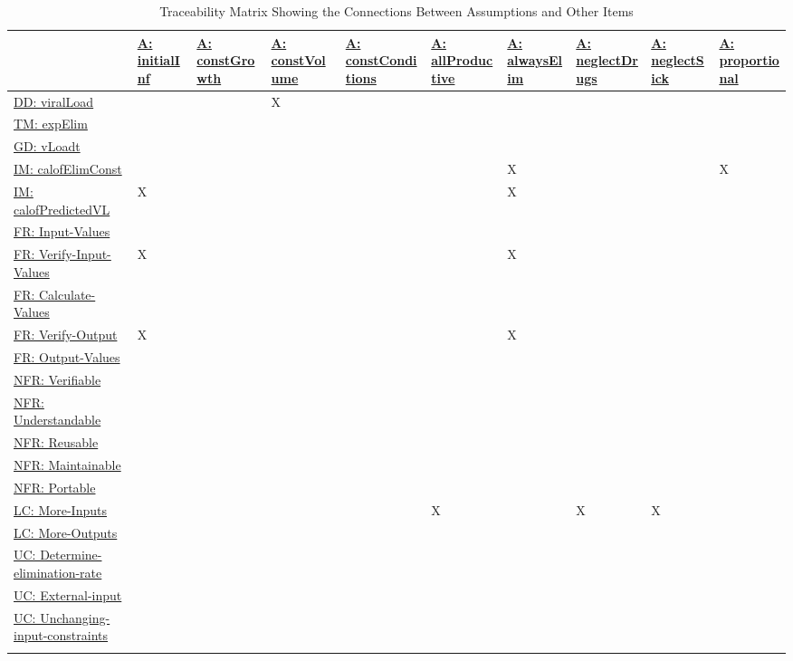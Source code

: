 \documentclass[12pt]{article}
\begin{document}
\begin{longtable}{l l l l l l l l l l}
\toprule
\textbf{} & \textbf{\hyperref[initialInf]{A: initialInf}} & \textbf{\hyperref[constGrowth]{A: constGrowth}} & \textbf{\hyperref[constVolume]{A: constVolume}} & \textbf{\hyperref[constConditions]{A: constConditions}} & \textbf{\hyperref[allProductive]{A: allProductive}} & \textbf{\hyperref[alwaysElim]{A: alwaysElim}} & \textbf{\hyperref[neglectDrugs]{A: neglectDrugs}} & \textbf{\hyperref[neglectSick]{A: neglectSick}} & \textbf{\hyperref[proportional]{A: proportional}}
\\
\midrule
\endhead
\hyperref[DD:viralLoad]{DD: viralLoad} &  &  & X &  &  &  &  &  & 
\\
\hyperref[TM:expElim]{TM: expElim} &  &  &  &  &  &  &  &  & 
\\
\hyperref[GD:vLoadt]{GD: vLoadt} &  &  &  &  &  &  &  &  & 
\\
\hyperref[IM:calofElimConst]{IM: calofElimConst} &  &  &  &  &  & X &  &  & X
\\
\hyperref[IM:calofPredictedVL]{IM: calofPredictedVL} & X &  &  &  &  & X &  &  & 
\\
\hyperref[inputValues]{FR: Input-Values} &  &  &  &  &  &  &  &  & 
\\
\hyperref[verifyInput]{FR: Verify-Input-Values} & X &  &  &  &  & X &  &  & 
\\
\hyperref[calcValues]{FR: Calculate-Values} &  &  &  &  &  &  &  &  & 
\\
\hyperref[verifyOutput]{FR: Verify-Output} & X &  &  &  &  & X &  &  & 
\\
\hyperref[outputValues]{FR: Output-Values} &  &  &  &  &  &  &  &  & 
\\
\hyperref[verifiable]{NFR: Verifiable} &  &  &  &  &  &  &  &  & 
\\
\hyperref[understandable]{NFR: Understandable} &  &  &  &  &  &  &  &  & 
\\
\hyperref[reusable]{NFR: Reusable} &  &  &  &  &  &  &  &  & 
\\
\hyperref[maintainable]{NFR: Maintainable} &  &  &  &  &  &  &  &  & 
\\
\hyperref[portable]{NFR: Portable} &  &  &  &  &  &  &  &  & 
\\
\hyperref[moreInputs]{LC: More-Inputs} &  &  &  &  & X &  & X & X & 
\\
\hyperref[moreOutputs]{LC: More-Outputs} &  &  &  &  &  &  &  &  & 
\\
\hyperref[detElimRate]{UC: Determine-elimination-rate} &  &  &  &  &  &  &  &  & 
\\
\hyperref[externalInput]{UC: External-input} &  &  &  &  &  &  &  &  & 
\\
\hyperref[inConstraints]{UC: Unchanging-input-constraints} &  &  &  &  &  &  &  &  & 
\\
\bottomrule
\caption{Traceability Matrix Showing the Connections Between Assumptions and Other Items}
\label{Table:TraceMatAvsAll}
\end{longtable}
\end{document}
